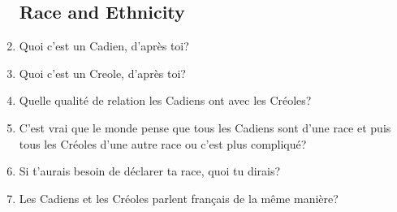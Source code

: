 \begin{enumerate}
  \subsection{Race and Ethnicity}
    \item Quoi c'est un Cadien, d'après toi? \\
    \item Quoi c'est un Creole, d'après toi? \\
    \item Quelle qualité de relation les Cadiens ont avec les Créoles? \\
    \item C'est vrai que le monde pense que tous les Cadiens sont d'une race et puis tous les Créoles d'une autre race ou c'est plus compliqué? \\
    \item Si t'aurais besoin de déclarer ta race, quoi tu dirais? \\
    \item Les Cadiens et les Créoles parlent français de la même manière? \\

\end{enumerate}
